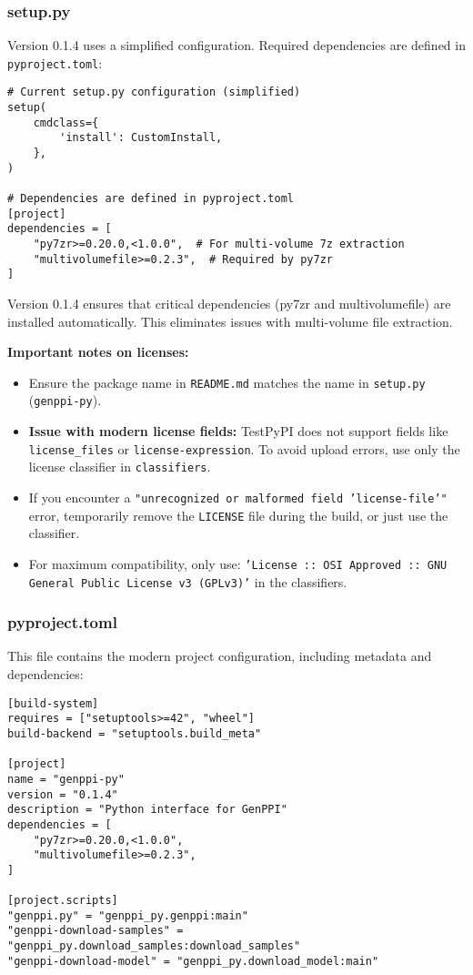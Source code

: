 \documentclass[11pt, a4paper]{article}
\begin{document}
\subsubsection{setup.py}
Version 0.1.4 uses a simplified configuration. Required dependencies are defined in \texttt{pyproject.toml}:
\begin{lstlisting}[style=pythonstyle]
# Current setup.py configuration (simplified)
setup(
    cmdclass={
        'install': CustomInstall,
    },
)

# Dependencies are defined in pyproject.toml
[project]
dependencies = [
    "py7zr>=0.20.0,<1.0.0",  # For multi-volume 7z extraction
    "multivolumefile>=0.2.3",  # Required by py7zr
]
\end{lstlisting}
Version 0.1.4 ensures that critical dependencies (py7zr and multivolumefile) are installed automatically. This eliminates issues with multi-volume file extraction.

\textbf{Important notes on licenses:} 
\begin{itemize}
    \item Ensure the package name in \texttt{README.md} matches the name in \texttt{setup.py} (\texttt{genppi-py}).
    \item \textbf{Issue with modern license fields:} TestPyPI does not support fields like \texttt{license\_files} or \texttt{license-expression}. To avoid upload errors, use only the license classifier in \texttt{classifiers}.
    \item If you encounter a \texttt{"unrecognized or malformed field 'license-file'"} error, temporarily remove the \texttt{LICENSE} file during the build, or just use the classifier.
    \item For maximum compatibility, only use: \texttt{'License :: OSI Approved :: GNU General Public License v3 (GPLv3)'} in the classifiers.
\end{itemize}

\subsubsection{pyproject.toml}
This file contains the modern project configuration, including metadata and dependencies:
\begin{lstlisting}[style=bashstyle]
[build-system]
requires = ["setuptools>=42", "wheel"]
build-backend = "setuptools.build_meta"

[project]
name = "genppi-py"
version = "0.1.4"
description = "Python interface for GenPPI"
dependencies = [
    "py7zr>=0.20.0,<1.0.0",
    "multivolumefile>=0.2.3",
]

[project.scripts]
"genppi.py" = "genppi_py.genppi:main"
"genppi-download-samples" = "genppi_py.download_samples:download_samples"
"genppi-download-model" = "genppi_py.download_model:main"
\end{lstlisting}
\end{document}
